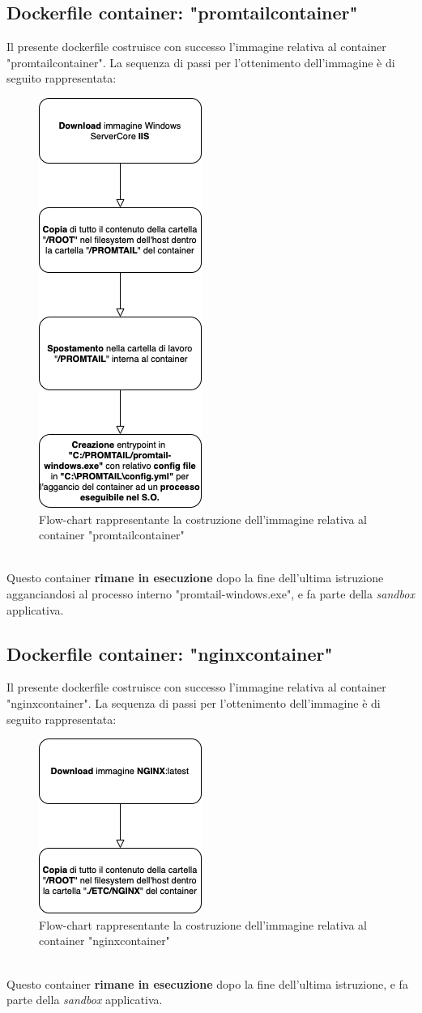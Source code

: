 \subsection{Dockerfile container: "promtailcontainer"}
Il presente dockerfile costruisce con successo l'immagine relativa al container "promtailcontainer". La sequenza di passi per l'ottenimento dell'immagine è di seguito rappresentata:
\begin{figure}[!h]     
\centering 
    \includegraphics[width=0.3\columnwidth]{immagini/flowchart/flowchart_promtailcontainer} 
    \caption{Flow-chart rappresentante la costruzione dell'immagine relativa al container "promtailcontainer"}
\end{figure} \\
Questo container \textbf{rimane in esecuzione} dopo la fine dell'ultima istruzione agganciandosi al processo interno "promtail-windows.exe", e fa parte della \textit{sandbox} applicativa.
\newpage
\subsection{Dockerfile container: "nginxcontainer"}
Il presente dockerfile costruisce con successo l'immagine relativa al container "nginxcontainer". La sequenza di passi per l'ottenimento dell'immagine è di seguito rappresentata:
\begin{figure}[!h]     
\centering 
    \includegraphics[width=0.3\columnwidth]{immagini/flowchart/flowchart_nginxcontainer} 
    \caption{Flow-chart rappresentante la costruzione dell'immagine relativa al container "nginxcontainer"}
\end{figure} \\
Questo container \textbf{rimane in esecuzione} dopo la fine dell'ultima istruzione, e fa parte della \textit{sandbox} applicativa.



